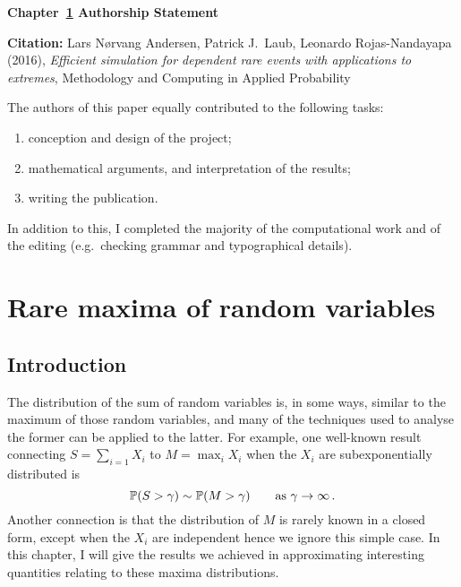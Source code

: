 \vspace*{\fill}

{\large \bf Chapter~\ref{chp:maxima} Authorship Statement}

\vspace{1em}

{\bf Citation:} Lars N{\o}rvang Andersen, Patrick J.\ Laub, Leonardo Rojas-Nandayapa (2016), \emph{Efficient simulation for dependent rare events with applications to extremes}, Methodology and Computing in Applied Probability

\vspace{1em}

The authors of this paper equally contributed to the following tasks:
\begin{enumerate}
\item conception and design of the project;
\item mathematical arguments, and interpretation of the results;
\item writing the publication.
\end{enumerate}

In addition to this, I completed the majority of the computational work and of the editing (e.g.\ checking grammar and typographical details).

\vspace{3em}

\vspace*{\fill}

\chapter{Rare maxima of random variables} \label{chp:maxima}

\section{Introduction}

The distribution of the sum of random variables is, in some ways, similar to the maximum of those random variables, and many of the techniques used to analyse the former can be applied to the latter. For example, one well-known result connecting $S = \sum_{i=1} X_i$ to $M = \max_i X_i$ when the $X_i$ are subexponentially distributed is
\[ \operatorname{{\mathbb P}}(S > \gamma) \sim \operatorname{{\mathbb P}}(M > \gamma) \qquad \text{as } \gamma \to \infty\,. \]
Another connection is that the distribution of $M$ is rarely known in a closed form, except when the $X_i$ are independent hence we ignore this simple case. In this chapter, I will give the results we achieved in approximating interesting quantities relating to these maxima distributions.

